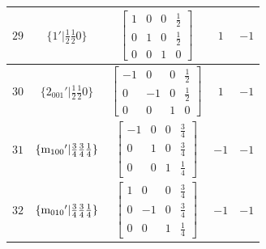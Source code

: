 \documentclass[fleqn,8pt]{jsarticle}
\begin{document}
\begin{longtable}{ccccc}
$ 29 $ & $ \{1{}'|\frac{1}{2} \frac{1}{2} 0\} $ & $ \begin{bmatrix} 1 & 0 & 0 & \frac{1}{2} \\ 0 & 1 & 0 & \frac{1}{2} \\ 0 & 0 & 1 & 0 \end{bmatrix} $ & $ 1 $ & $ -1 $ \\ \hline
$ 30 $ & $ \{2{}_{001}{}'|\frac{1}{2} \frac{1}{2} 0\} $ & $ \begin{bmatrix} -1 & 0 & 0 & \frac{1}{2} \\ 0 & -1 & 0 & \frac{1}{2} \\ 0 & 0 & 1 & 0 \end{bmatrix} $ & $ 1 $ & $ -1 $ \\ \hline
$ 31 $ & $ \{{\rm m}_{100}{}'|\frac{3}{4} \frac{3}{4} \frac{1}{4}\} $ & $ \begin{bmatrix} -1 & 0 & 0 & \frac{3}{4} \\ 0 & 1 & 0 & \frac{3}{4} \\ 0 & 0 & 1 & \frac{1}{4} \end{bmatrix} $ & $ -1 $ & $ -1 $ \\ \hline
$ 32 $ & $ \{{\rm m}_{010}{}'|\frac{3}{4} \frac{3}{4} \frac{1}{4}\} $ & $ \begin{bmatrix} 1 & 0 & 0 & \frac{3}{4} \\ 0 & -1 & 0 & \frac{3}{4} \\ 0 & 0 & 1 & \frac{1}{4} \end{bmatrix} $ & $ -1 $ & $ -1 $ \\
\end{longtable}
\end{document}
